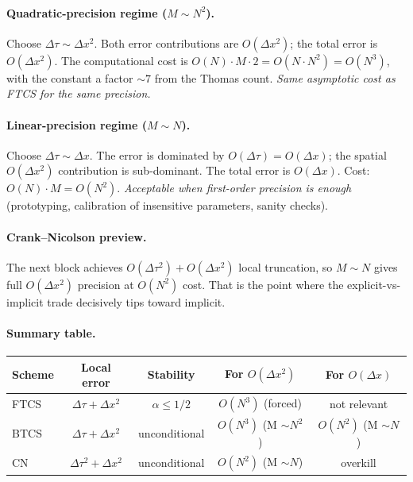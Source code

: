 \documentclass[11pt,a4paper]{article}
\begin{document}
\paragraph{Quadratic-precision regime ($M \sim N^2$).} Choose
$\Delta\tau \sim \Delta x^2$. Both error contributions are
$O(\Delta x^2)$; the total error is $O(\Delta x^2)$. The
computational cost is $O(N) \cdot M \cdot 2 = O(N \cdot N^2) =
O(N^3)$, with the constant a factor $\sim 7$ from the Thomas count.
\emph{Same asymptotic cost as FTCS for the same precision.}

\paragraph{Linear-precision regime ($M \sim N$).} Choose
$\Delta\tau \sim \Delta x$. The error is dominated by $O(\Delta\tau)
= O(\Delta x)$; the spatial $O(\Delta x^2)$ contribution is
sub-dominant. The total error is $O(\Delta x)$. Cost: $O(N) \cdot
M = O(N^2)$. \emph{Acceptable when first-order precision is enough}
(prototyping, calibration of insensitive parameters, sanity checks).

\paragraph{Crank--Nicolson preview.} The next block achieves
$O(\Delta\tau^2) + O(\Delta x^2)$ local truncation, so $M \sim N$
gives full $O(\Delta x^2)$ precision at $O(N^2)$ cost. That is the
point where the explicit-vs-implicit trade decisively tips toward
implicit.

\paragraph{Summary table.}
\begin{center}
\begin{tabular}{lcccc}
\hline
Scheme & Local error & Stability & For $O(\Delta x^2)$ & For $O(\Delta x)$ \\
\hline
FTCS  & $\Delta\tau + \Delta x^2$  & $\alpha \le 1/2$       & $O(N^3)$ (forced) & not relevant \\
BTCS  & $\Delta\tau + \Delta x^2$  & unconditional          & $O(N^3)$ (M $\sim N^2$) & $O(N^2)$ (M $\sim N$) \\
CN    & $\Delta\tau^2 + \Delta x^2$ & unconditional         & $O(N^2)$ (M $\sim N$) & overkill \\
\hline
\end{tabular}
\end{center}
\end{document}
